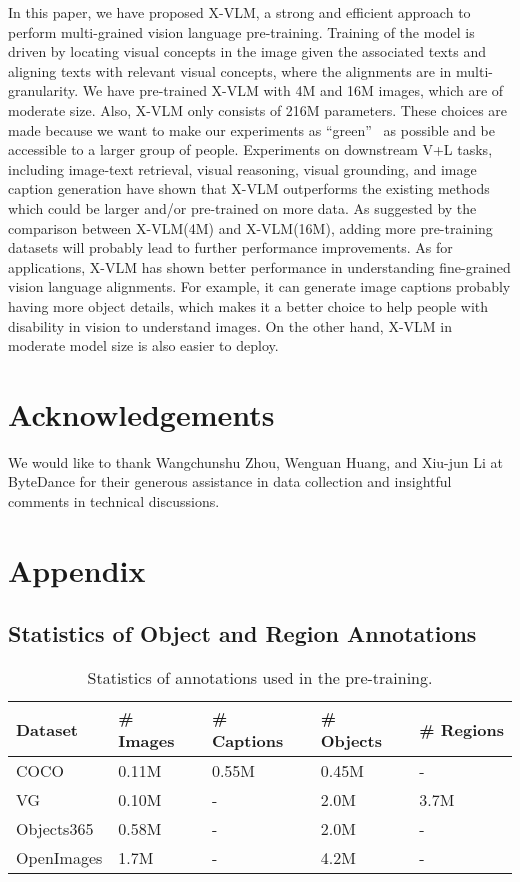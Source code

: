 \documentclass[nohyperref]{article}
\theoremstyle{plain}
\theoremstyle{definition}
\theoremstyle{remark}
\begin{document}
In this paper, we have proposed X-VLM, a strong and efficient approach to perform multi-grained vision language pre-training. Training of the model is driven by locating visual concepts in the image given the associated texts and aligning texts with relevant visual concepts, where the alignments are in multi-granularity. We have pre-trained X-VLM with 4M and 16M images, which are of moderate size. Also, X-VLM only consists of 216M parameters. These choices are made because we want to make our experiments as ``green''~\cite{schwartz2020green,xu2021survey} as possible and be accessible to a larger group of people. Experiments on downstream V+L tasks, including image-text retrieval, visual reasoning, visual grounding, and image caption generation have shown that X-VLM outperforms the existing methods which could be larger and/or pre-trained on more data. As suggested by the comparison between X-VLM(4M) and X-VLM(16M), adding more pre-training datasets will probably lead to further performance improvements. As for applications, X-VLM has shown better performance in understanding fine-grained vision language alignments. For example, it can generate image captions probably having more object details, which makes it a better choice to help people with disability in vision to understand images. On the other hand, X-VLM in moderate model size is also easier to deploy. 



\section*{Acknowledgements}
We would like to thank Wangchunshu Zhou, Wenguan Huang, and Xiu-jun Li at ByteDance for their generous assistance in data collection and insightful comments in technical discussions.







\newpage
\appendix
\onecolumn

\section{Appendix}
\subsection{Statistics of Object and Region Annotations}
\label{app:ann}

\begin{table}[ht]
	\caption
	{
	Statistics of annotations used in the pre-training.
	}
	\label{tbl:ann}
\small
	\centering	
\begin{tabular}	{l | l | l |  l | l }
	\toprule
	 Dataset & \# Images  & \# Captions & \# Objects & \# Regions \\
\midrule
	 COCO & 0.11M & 0.55M & 0.45M & - \\
	 VG & 0.10M & - & 2.0M & 3.7M \\
	 Objects365 & 0.58M  & - & 2.0M & - \\ 
	 OpenImages & 1.7M  & - & 4.2M & - \\
	 \bottomrule
	\end{tabular}
\end{table}
\end{document}
